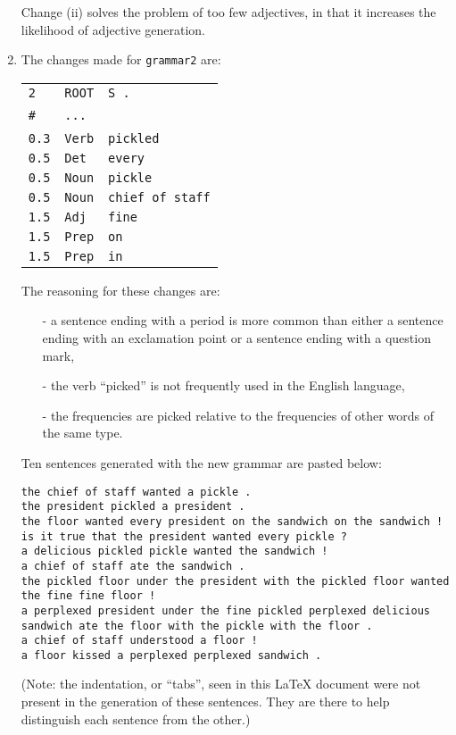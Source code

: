 \documentclass[11pt]{article}
\newcommand{\code}[1]{\texttt{#1}}
\begin{document}
\begin{enumerate}
	Change (ii) solves the problem of too few adjectives, in that it increases the likelihood of adjective generation.
\item
	The changes made for \code{grammar2} are:
	\begin{center} \begin{tabular}{l l l}
	\code{2}    & \code{ROOT} & \code{S .} \\
	\code{\#}    & \code {...} & \ \\
	\code{0.3} & \code{Verb} & \code{pickled} \\
	\code{0.5} & \code{Det} & \code{every} \\
	\code{0.5} & \code{Noun} & \code{pickle} \\
	\code{0.5} & \code{Noun} & \code{chief of staff} \\
	\code{1.5} & \code{Adj} & \code{fine} \\
	\code{1.5} & \code{Prep} & \code{on} \\
	\code{1.5} & \code{Prep} & \code{in} 
	\end{tabular} \end{center}
	
	The reasoning for these changes are:
        \begin{itemize}
        \item[-] a sentence ending with a period is more common than either a sentence ending with an exclamation point or a sentence ending with a question mark,
        \item[-] the verb ``picked'' is not frequently used in the English language,
        \item[-] the frequencies are picked relative to the frequencies of other words of the same type.
        \end{itemize}
        
        Ten sentences generated with the new grammar are pasted below:
        \begin{lstlisting}
the chief of staff wanted a pickle .
the president pickled a president .
the floor wanted every president on the sandwich on the sandwich !
is it true that the president wanted every pickle ?
a delicious pickled pickle wanted the sandwich !
a chief of staff ate the sandwich .
the pickled floor under the president with the pickled floor wanted the fine fine floor !
a perplexed president under the fine pickled perplexed delicious sandwich ate the floor with the pickle with the floor .
a chief of staff understood a floor !
a floor kissed a perplexed perplexed sandwich .
        \end{lstlisting}
        (Note: the indentation, or ``tabs'', seen in this LaTeX document were not present in the generation of these sentences. They are there to help distinguish each sentence from the other.)
	
\end{enumerate}
\end{document}
